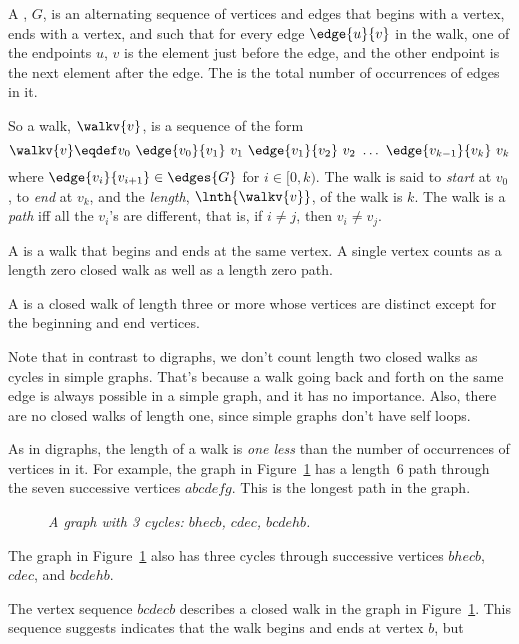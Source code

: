 \begin{definition}\label{def:simplegraph-walks}
A , $G$, is an alternating sequence of
vertices and edges that begins with a vertex, ends with a vertex, and
such that for every edge $\edge{u}{v}$ in the walk, one of the
endpoints $u$, $v$ is the element just before the edge, and the other
endpoint is the next element after the edge.  The  is the total number of occurrences of edges in it.

So a walk, $\walkv{v}$, is a sequence of the form
\[
\walkv{v} \eqdef v_0\ \edge{v_0}{v_1}\
v_1\  \edge{v_1}{v_2}\  v_2\  \dots\  \edge{v_{k-1}}{v_k}\  v_k
\]
where $\edge{v_i}{v_{i+1}} \in \edges{G}$ for $i \in [0,k)$.
  The walk is said to \emph{start} at $v_0$, to \emph{end} at $v_k$,
  and the \emph{length}, $\lnth{\walkv{v}}$, of the walk is
  $k$.  The walk is a \emph{path} iff all the $v_i$'s are different,
  that is, if $i \neq j$, then $v_i \neq v_j$.

A  is a walk that begins and ends at the same
vertex.  A single vertex counts as a length zero closed walk as well
as a length zero path.

A  is a closed walk of length three or more whose
vertices are distinct except for the beginning and end vertices.
\end{definition}
Note that in contrast to digraphs, we don't count length two closed
walks as cycles in simple graphs.  That's because a walk going back
and forth on the same edge is always possible in a simple graph, and
it has no importance.  Also, there are no closed walks of length one,
since simple graphs don't have self loops.

As in digraphs, the length of a walk is \emph{one less} than the
number of occurrences of vertices in it.  For example, the graph in
Figure~\ref{dg} has a length~6 path through the seven successive
vertices $abcdefg$.  This is the longest path in the graph.
\begin{figure}
\caption{\em A graph with 3 cycles: $bhecb$,
$cdec$, $bcdehb$.}
\label{dg}
\end{figure}
The graph in Figure~\ref{dg} also has three cycles through successive vertices $bhecb$,
$cdec$, and $bcdehb$.

\iffalse
The vertex sequence $bcdecb$ describes a closed walk in the graph
in Figure~\ref{dg}.  This sequence suggests indicates that the walk
begins and ends at vertex $b$, but


